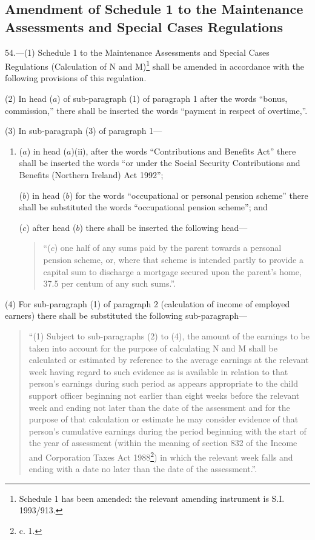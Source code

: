 \documentclass[a4paper]{article}
\begin{document}
\subsection[54. Amendment of Schedule 1 to the Maintenance Assessments and Special Cases Regulations]{Amendment of Schedule 1 to the Maintenance Assessments and Special Cases Regulations}

54.—(1) Schedule 1 to the Maintenance Assessments and Special Cases Regulations (Calculation of N and M)\footnote{\frenchspacing Schedule 1 has been amended: the relevant amending instrument is S.I. 1993/913.} shall be amended in accordance with the following provisions of this regulation.

(2) In head ($a$) of sub-paragraph (1) of paragraph 1 after the words “bonus, commission,” there shall be inserted the words “payment in respect of overtime,”.

(3) In sub-paragraph (3) of paragraph 1—
\begin{enumerate}\item[]
($a$) in head ($a$)(ii), after the words “Contributions and Benefits Act” there shall be inserted the words “or under the Social Security Contributions and Benefits (Northern Ireland) Act 1992”;

($b$) in head ($b$) for the words “occupational or personal pension scheme” there shall be substituted the words “occupational pension scheme”; and

($c$) after head ($b$) there shall be inserted the following head—
\begin{quotation}
“($c$) one half of any sums paid by the parent towards a personal pension scheme, or, where that scheme is intended partly to provide a capital sum to discharge a mortgage secured upon the parent’s home, 37.5 per centum of any such sums.”.
\end{quotation}
\end{enumerate}

(4) For sub-paragraph (1) of paragraph 2 (calculation of income of employed earners) there shall be substituted the following sub-paragraph—
\begin{quotation}
“(1) Subject to sub-paragraphs (2) to (4), the amount of the earnings to be taken into account for the purpose of calculating N and M shall be calculated or estimated by reference to the average earnings at the relevant week having regard to such evidence as is available in relation to that person’s earnings during such period as appears appropriate to the child support officer beginning not earlier than eight weeks before the relevant week and ending not later than the date of the assessment and for the purpose of that calculation or estimate he may consider evidence of that person’s cumulative earnings during the period beginning with the start of the year of assessment (within the meaning of section 832 of the Income and Corporation Taxes Act 1988\footnote{ c. 1.}) in which the relevant week falls and ending with a date no later than the date of the assessment.”.
\end{quotation}
\end{document}
